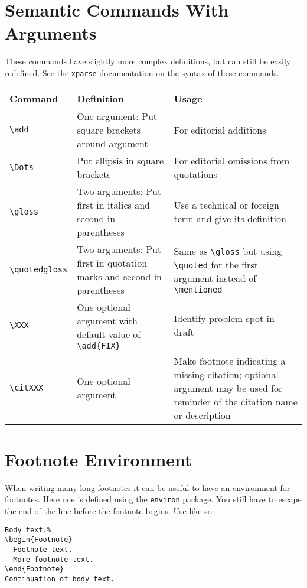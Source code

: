 \documentclass{article}
\begin{document}
\section{Semantic Commands With Arguments}

These commands have slightly more complex definitions, but can still be easily redefined.
See the \texttt{xparse} documentation on the syntax of these commands.

\begin{center}
\begin{tabularx}{\linewidth}{lXX}
\toprule
Command & Definition & Usage\\
\midrule
\verb|\add| & One argument: Put square brackets around argument & For editorial additions\\
\verb|\Dots| & Put ellipsis in square brackets & For editorial omissions from quotations\\
\verb|\gloss| & Two arguments: Put first in italics and second in parentheses & Use a technical or foreign term and give its definition\\
\verb|\quotedgloss| & Two arguments: Put first in quotation marks and second in parentheses & Same as \verb|\gloss| but using \verb|\quoted| for the first argument instead of \verb|\mentioned|\\
\verb|\XXX| & One optional argument with default value of \verb|\add{FIX}| & Identify problem spot in draft\\
\verb|\citXXX| & One optional argument & Make footnote indicating a missing citation; optional argument may be used for reminder of the citation name or description\\
\bottomrule
\end{tabularx}
\end{center}

\section{Footnote Environment}

When writing many long footnotes it can be useful to have an environment for footnotes.
Here one is defined using the \texttt{environ} package.
You still have to escape the end of the line before the footnote begins.
Use like so:

\begin{verbatim}
Body text.%
\begin{Footnote}
  Footnote text.
  More footnote text.
\end{Footnote}
Continuation of body text.
\end{verbatim}
\end{document}
